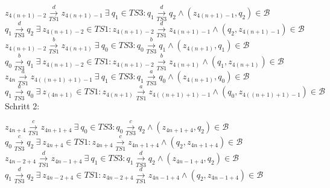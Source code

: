 \documentclass[a4paper,11pt,fleqn]{scrartcl}
\begin{document}
\begin{enumerate}
\begin{enumerate}
\begin{enumerate}
					\(z_{4(n+1)-2}\overset{d}{\underset{TS1}{\rightarrow}}z_{4(n+1)-1}\ \exists\ q_1 \in 
					TS3:q_1\overset{d}{\underset{TS3}{\rightarrow}}q_2 \land (z_{4(n+1)-1},q_2)\in
					 \mathcal{B}\) \\
					
					\(q_1\overset{d}{\underset{TS3}{\rightarrow}}q_2\ \exists\ z_{4(n+1)-2} \in 
					TS1:z_{4(n+1)-2}\overset{d}{\underset{TS1}{\rightarrow}}z_{4(n+1)-1} \land 
					(q_2,z_{4(n+1)-1})\in \mathcal{B}\) \\
					
					\(z_{4(n+1)-2}\overset{b}{\underset{TS1}{\rightarrow}}z_{4(n+1)}\ \exists\ q_0 \in 
					TS3:q_0\overset{b}{\underset{TS3}{\rightarrow}}q_1 \land (z_{4(n+1)},q_1)\in \mathcal{B}\) \\
					
					\(q_0\overset{b}{\underset{TS3}{\rightarrow}}q_1\ \exists\ z_{4(n+1)-2} \in 
					TS1:z_{4(n+1)-2}\overset{b}{\underset{TS1}{\rightarrow}}z_{4(n+1)} \land 
					(q_1,z_{4(n+1)})\in \mathcal{B}\) \\
					
					\(z_{4n}\overset{a}{\underset{TS1}{\rightarrow}}z_{4((n+1)+1)-1}\ \exists\ q_1 \in 
					TS3:q_1\overset{a}{\underset{TS3}{\rightarrow}}q_0 \land (z_{4(n+1)},q_0)\in \mathcal{B}\) \\
					
					\(q_1\overset{a}{\underset{TS3}{\rightarrow}}q_0\ \exists\ z_{(4n+1)} \in 
					TS1:z_{4(n+1)}\overset{a}{\underset{TS1}{\rightarrow}}z_{4((n+1)+1)-1} \land 
					(q_0,z_{4((n+1)+1)-1})\in \mathcal{B}\) \\				
				
				Schritt 2:
				
					\(z_{4n+4}\overset{c}{\underset{TS1}{\rightarrow}}z_{4n+1+4}\ \exists\ q_0 \in 
					TS3:q_0\overset{c}{\underset{TS3}{\rightarrow}}q_2 \land (z_{4n+1+4},q_2)\in \mathcal{B}\) \\
					
					\(q_0\overset{c}{\underset{TS3}{\rightarrow}}q_2\ \exists\ z_{4n+4} \in 
					TS1:z_{4n+4}\overset{c}{\underset{TS1}{\rightarrow}}z_{4n+1+4} \land (q_2,z_{4n+1+4})\in
					\mathcal{B}\) \\
					
					\(z_{4n-2+4}\overset{d}{\underset{TS1}{\rightarrow}}z_{4n-1+4}\ \exists\ q_1 \in 
					TS3:q_1\overset{d}{\underset{TS3}{\rightarrow}}q_2 \land (z_{4n-1+4},q_2)\in \mathcal{B}\) \\
					
					\(q_1\overset{d}{\underset{TS3}{\rightarrow}}q_2\ \exists\ z_{4n-2+4} \in 
					TS1:z_{4n-2+4}\overset{d}{\underset{TS1}{\rightarrow}}z_{4n-1+4} \land (q_2,z_{4n-1+4})\in
					\mathcal{B}\) \\
					

\end{enumerate}
\end{enumerate}
\end{enumerate}
\end{document}
